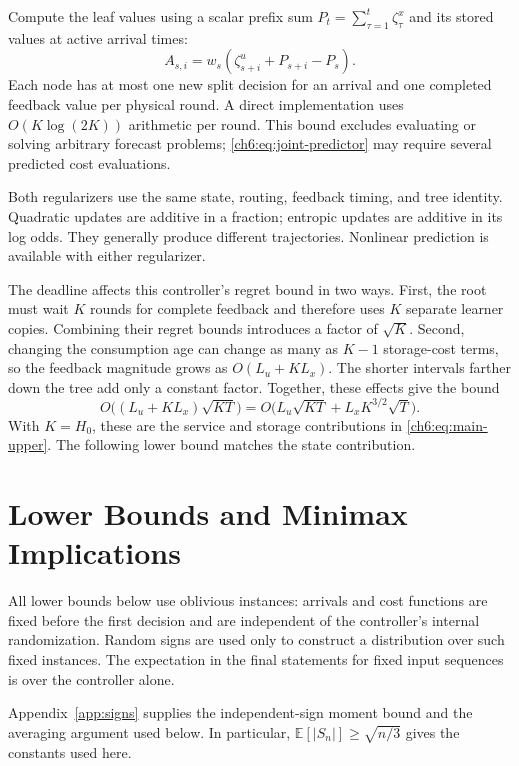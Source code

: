 \documentclass[11pt]{article}
\newcommand{\E}{\mathbb{E}}
\theoremstyle{plain}
\theoremstyle{remark}
\numberwithin{equation}{section}
\begin{document}
Compute the leaf values using a scalar prefix sum
$P_t=\sum_{\tau=1}^t\zeta_\tau^x$ and its stored values at active arrival times:
\[
 A_{s,i}=w_s(\zeta_{s+i}^u+P_{s+i}-P_s).
\]
Each node has at most one new split decision for an arrival and one completed feedback value per
physical round. A direct implementation uses $O(K\log(2K))$ arithmetic per
round. This bound excludes evaluating or solving arbitrary forecast problems;
\eqref{ch6:eq:joint-predictor} may require several predicted cost evaluations.

Both regularizers use the same state, routing, feedback timing, and tree
identity. Quadratic updates are additive in a fraction; entropic updates are
additive in its log odds. They generally produce different trajectories.
Nonlinear prediction is available with either regularizer.

The deadline affects this controller's regret bound in two ways. First,
the root must wait $K$ rounds for complete feedback and therefore uses
$K$ separate learner copies. Combining their regret bounds introduces a
factor of $\sqrt K$. Second, changing the consumption age can change as
many as $K-1$ storage-cost terms, so the feedback magnitude grows as
$O(L_u+KL_x)$. The shorter intervals farther down the tree add only a
constant factor. Together, these effects give the bound
\[
 O\bigl((L_u+KL_x)\sqrt{KT}\bigr)
 =O\bigl(L_u\sqrt{KT}+L_xK^{3/2}\sqrt T\bigr).
\]
With $K=H_0$, these are the service and storage contributions in
\eqref{ch6:eq:main-upper}.
The following lower bound matches the state contribution.

\section{Lower Bounds and Minimax Implications}
\label{ch6:sec:lower}
All lower bounds below use oblivious instances: arrivals and cost functions
are fixed before the first decision and are independent of the controller's internal
randomization. Random signs are used only to construct a distribution over
such fixed instances. The expectation in the final statements for fixed
input sequences is over the controller alone.

Appendix~\ref{app:signs} supplies the independent-sign moment bound
and the averaging argument used below. In particular,
$\E[|S_n|]\ge\sqrt{n/3}$ gives the constants used here.
\end{document}
